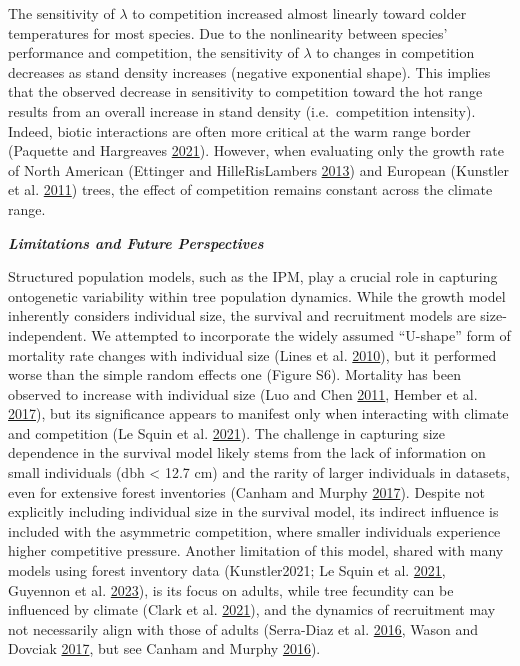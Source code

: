 \documentclass[12pt]{article}
\begin{document}
The sensitivity of \(\lambda\) to competition increased almost linearly
toward colder temperatures for most species. Due to the nonlinearity
between species' performance and competition, the sensitivity of
\(\lambda\) to changes in competition decreases as stand density
increases (negative exponential shape). This implies that the observed
decrease in sensitivity to competition toward the hot range results from
an overall increase in stand density (i.e.~competition intensity).
Indeed, biotic interactions are often more critical at the warm range
border (Paquette and Hargreaves
\protect\hyperlink{ref-Paquette2021}{2021}). However, when evaluating
only the growth rate of North American (Ettinger and HilleRisLambers
\protect\hyperlink{ref-Ettinger2013}{2013}) and European (Kunstler et
al. \protect\hyperlink{ref-Kunstler2011a}{2011}) trees, the effect of
competition remains constant across the climate range.

\textbf{\emph{Limitations and Future Perspectives}}

Structured population models, such as the IPM, play a crucial role in
capturing ontogenetic variability within tree population dynamics. While
the growth model inherently considers individual size, the survival and
recruitment models are size-independent. We attempted to incorporate the
widely assumed ``U-shape'' form of mortality rate changes with
individual size (Lines et al. \protect\hyperlink{ref-Lines2010}{2010}),
but it performed worse than the simple random effects one (Figure S6).
Mortality has been observed to increase with individual size (Luo and
Chen \protect\hyperlink{ref-Luo2011}{2011}, Hember et al.
\protect\hyperlink{ref-Hember2017}{2017}), but its significance appears
to manifest only when interacting with climate and competition (Le Squin
et al. \protect\hyperlink{ref-LeSquin2021}{2021}). The challenge in
capturing size dependence in the survival model likely stems from the
lack of information on small individuals (dbh \textless{} 12.7 cm) and
the rarity of larger individuals in datasets, even for extensive forest
inventories (Canham and Murphy
\protect\hyperlink{ref-Canham2017}{2017}). Despite not explicitly
including individual size in the survival model, its indirect influence
is included with the asymmetric competition, where smaller individuals
experience higher competitive pressure. Another limitation of this
model, shared with many models using forest inventory data
(Kunstler2021; Le Squin et al.
\protect\hyperlink{ref-LeSquin2021}{2021}, Guyennon et al.
\protect\hyperlink{ref-Guyennon2023}{2023}), is its focus on adults,
while tree fecundity can be influenced by climate (Clark et al.
\protect\hyperlink{ref-Clark2021}{2021}), and the dynamics of
recruitment may not necessarily align with those of adults (Serra-Diaz
et al. \protect\hyperlink{ref-SerraDiaz2016}{2016}, Wason and Dovciak
\protect\hyperlink{ref-Wason2017}{2017}, but see Canham and Murphy
\protect\hyperlink{ref-Canham2016}{2016}).
\end{document}
